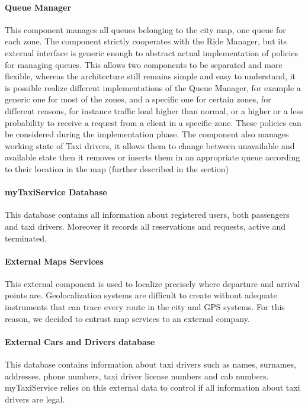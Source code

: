 \paragraph{Queue Manager}
This component manages all queues belonging to the city map, one queue for each zone. The component strictly cooperates with the Ride Manager, but its external interface is generic enough to abstract actual implementation of policies for managing queues. This allows two components to be separated and more flexible, whereas the architecture still remains simple and easy to understand, it is possible realize different implementations of the Queue Manager, for example a generic one for most of the zones, and a specific one for certain zones, for different reasons, for instance traffic load higher than normal, or a higher or a less probability to receive a request from a client in a specific zone. These policies can be considered during the implementation phase. \newline
The component also manages working state of Taxi drivers, it allows them to change between unavailable and available state then it removes or inserts them in an appropriate queue according to their location in the map (further described in the  section)
\paragraph{myTaxiService Database}
This database contains all information about registered users, both passengers and taxi drivers. Moreover it records all reservations and requests, active and terminated.
\paragraph{External Maps Services}
This external component is used to localize precisely where departure and arrival points are. Geolocalization systems are difficult to create without adequate instruments that can trace every route in the city and GPS systems. For this reason, we decided to entrust map services to an external company.
\paragraph{External Cars and Drivers database}
This database contains information about taxi drivers such as names, surnames, addresses, phone numbers, taxi driver license numbers and cab numbers. myTaxiService relies on this external data to control if all information about taxi drivers are legal.
